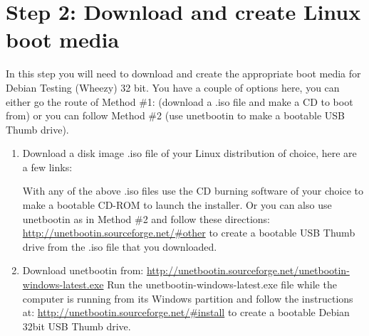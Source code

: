 \documentclass[12pt,notitlepage,onecolumn,oneside,openany]{memoir}
\begin{document}
\chapter{\textsf{Step 2: Download and create Linux boot media}} 
\textsf{In this step you will need to download and create the appropriate boot media for Debian Testing (Wheezy) 32 bit.
You have a couple of options here, you can either go the route of Method \#1: (download a .iso file and make a CD to boot from) or you can follow Method \#2 (use unetbootin to make a bootable USB Thumb drive).} \newline

\begin{enumerate}
\item \textsf{Download a disk image .iso file of your Linux distribution of choice, here are a few links:} 



\textsf{With any of the above .iso files use the CD burning software of your choice to make a bootable CD-ROM to launch the installer. Or you can also use unetbootin as in Method \#2 and follow these directions:} \newline
\url{http://unetbootin.sourceforge.net/#other} \newline
\textsf{to create a bootable USB Thumb drive from the .iso file that you downloaded.}

\item \textsf{Download unetbootin from:} \newline
\url{http://unetbootin.sourceforge.net/unetbootin-windows-latest.exe}\newline
\textsf{Run the unetbootin-windows-latest.exe file while the computer is running from its Windows partition and follow the instructions at:} \newline
\url{http://unetbootin.sourceforge.net/#install} \newline
\textsf{to create a bootable Debian 32bit USB Thumb drive.}
\end{enumerate}
\end{document}
